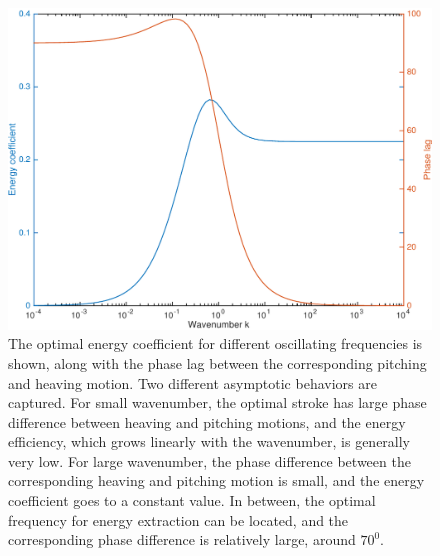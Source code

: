 \begin{figure}
\begin{center}
\includegraphics[width=13cm]{Figures/theodorsen/TheodorsenEnergy.pdf}
\end{center}
\caption[The optimal stoke for energy extraction at different oscillating frequencies of plate]{The optimal energy coefficient for different oscillating frequencies is shown, along with the phase lag between the corresponding pitching and heaving motion. Two different asymptotic behaviors are captured. For small wavenumber, the optimal stroke has large phase difference between heaving and pitching motions, and the energy efficiency, which grows linearly with the wavenumber, is generally very low. For large wavenumber, the phase difference between the corresponding heaving and pitching motion is small, and the energy coefficient goes to a constant value. In between, the optimal frequency for energy extraction can be located, and the corresponding phase difference is relatively large, around $70^0$.}
\label{fig:Theodorsen}
\end{figure}

